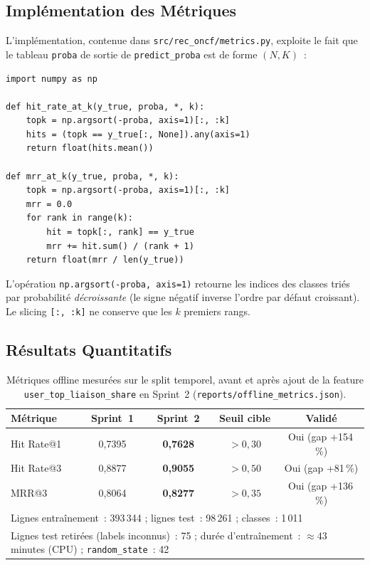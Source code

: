 \documentclass[11pt, a4paper]{article}
\begin{document}
\subsection{Implémentation des Métriques}

L'implémentation, contenue dans \texttt{src/rec\_oncf/metrics.py},
exploite le fait que le tableau \texttt{proba} de sortie de
\texttt{predict\_proba} est de forme $(N, K)$~:

\begin{lstlisting}[style=py, caption={Implémentation des métriques}]
import numpy as np

def hit_rate_at_k(y_true, proba, *, k):
    topk = np.argsort(-proba, axis=1)[:, :k]
    hits = (topk == y_true[:, None]).any(axis=1)
    return float(hits.mean())

def mrr_at_k(y_true, proba, *, k):
    topk = np.argsort(-proba, axis=1)[:, :k]
    mrr = 0.0
    for rank in range(k):
        hit = topk[:, rank] == y_true
        mrr += hit.sum() / (rank + 1)
    return float(mrr / len(y_true))
\end{lstlisting}

L'opération \texttt{np.argsort(-proba, axis=1)} retourne les indices
des classes triés par probabilité \textit{décroissante} (le signe
négatif inverse l'ordre par défaut croissant). Le slicing
\texttt{[:, :k]} ne conserve que les $k$ premiers rangs.

\subsection{Résultats Quantitatifs}

\begin{table}[h]
\centering
\small
\begin{tabularx}{\textwidth}{|X|c|c|c|c|}
\hline
\textbf{Métrique} & \textbf{Sprint~1} & \textbf{Sprint~2} & \textbf{Seuil cible} & \textbf{Validé} \\
\hline
Hit Rate@1 & 0{,}7395 & \textbf{0{,}7628} & $> 0{,}30$ & Oui (gap +154\,\%) \\
\hline
Hit Rate@3 & 0{,}8877 & \textbf{0{,}9055} & $> 0{,}50$ & Oui (gap +81\,\%) \\
\hline
MRR@3      & 0{,}8064 & \textbf{0{,}8277} & $> 0{,}35$ & Oui (gap +136\,\%) \\
\hline
\multicolumn{5}{|l|}{\small Lignes entraînement~: 393\,344 ; lignes test~: 98\,261 ; classes~: 1\,011} \\
\hline
\multicolumn{5}{|l|}{\small Lignes test retirées (labels inconnus)~: 75 ; durée d'entraînement~: $\approx 43$ minutes (CPU) ; \texttt{random\_state}~: 42} \\
\hline
\end{tabularx}
\caption{Métriques offline mesurées sur le split temporel,
avant et après ajout de la feature \texttt{user\_top\_liaison\_share}
en Sprint~2 (\texttt{reports/offline\_metrics.json}).}
\end{table}
\end{document}
